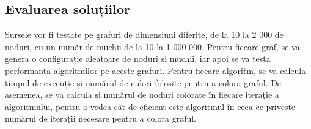 \documentclass[runningheads]{llncs}
\begin{document}
\subsection{Evaluarea soluțiilor}
Sursele vor fi testate pe grafuri de dimensiuni diferite, de la 10 la 2 000 de noduri,
cu un număr de muchii de la 10 la 1 000 000. Pentru fiecare graf, se va genera o
configurație aleatoare de noduri și muchii, iar apoi se va testa performanța
algoritmilor pe aceste grafuri. Pentru fiecare algoritm, se va calcula timpul de
execuție și numărul de culori folosite pentru a colora graful. De asemenea, se va
calcula și numărul de noduri colorate în fiecare iterație a algoritmului, pentru a
vedea cât de eficient este algoritmul în ceea ce privește numărul de iterații
necesare pentru a colora graful.






\end{document}
